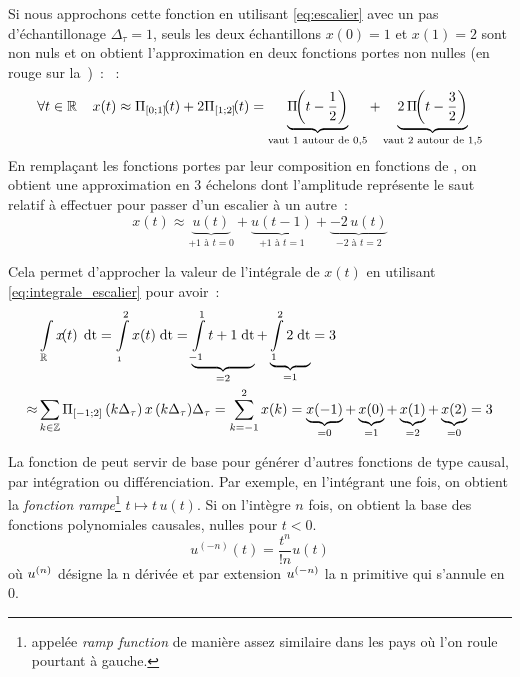 \begin{exemple}
        Si nous approchons cette fonction en utilisant 
        \eqref{eq:escalier} avec un pas d'échantillonage
        $\Delta_\tau=1$, seuls les deux échantillons $x(0)=1$ et
        $x(1)=2$ sont non nuls et on obtient l'approximation en deux
        fonctions portes non nulles (en rouge sur
        la~)~: ~:
        \begin{equation*}
          \forall t\in\R\quads x(t)\approx \porteDe{0}{1}\de{t}+2\porteDe{1}{2}\de{t} = \underbrace{\porte\de{t-\frac{1}{2}}}_{\text{vaut 1 autour de }0,5}+\underbrace{2\,\porte\de{t-\frac{3}{2}}}_{\text{vaut 2 autour de }1,5}
        \end{equation*}
        En remplaçant les fonctions portes par leur composition en
        fonctions de \Heaviside{}, on obtient une approximation en 3
        échelons dont l'amplitude représente le saut relatif à
        effectuer pour passer d'un escalier à un autre~:
        \begin{equation*}
          x(t) \approx \underbrace{u(t)}_{+1\text{ à }t=0} + \underbrace{u(t-1)}_{+1\text{ à }t=1} +\underbrace{ -2\,u(t)}_{-2\text{ à }t=2}
        \end{equation*}

        Cela permet d'approcher la valeur de l'intégrale de $x(t)$
        en utilisant \eqref{eq:integrale_escalier} pour avoir~:
        \begin{eqnarray*}
          &\int\limits_{\mathbb{R}}^{}{x\!\!\left(t\right)\;\mathrm{d{t}}}=\int\limits_{_1}^{2}{x(t)\;\mathrm{d{t}}}=\underbrace{\int\limits_{-1}^{1}{t+1\;\mathrm{d{t}}}}_{=2}+\underbrace{\int\limits_{1}^{2}{2\;\mathrm{d{t}}}}_{=1} = 3 \\
          \approx  &\sum\limits_{k\in\mathbb{Z}}^{}{\Pi_{\left[-1 ; 2\right]}\left(k\Delta_\tau\right)x\left(k\Delta_\tau\right)}\Delta_\tau =  \sum\limits_{k=-1}^{2}{x(k)} = \underbrace{x(-1)}_{=0} + \underbrace{x(0)}_{=1} + \underbrace{x(1)}_{=2} + \underbrace{x(2)}_{=0} = 3
        \end{eqnarray*} 
      \end{exemple}
      
      La fonction de \Heaviside{} peut servir de base pour générer
      d'autres fonctions de type causal, par intégration ou
      différenciation. Par exemple, en l'intégrant une fois, on
      obtient la \emph{fonction rampe}\footnote{appelée \emph{ramp
          function} de manière assez similaire dans les pays où l'on
        roule pourtant à gauche.} $t\mapsto t\,u(t)$. Si on l'intègre
      $n$ fois, on obtient la base des fonctions polynomiales
      causales, \cad{} nulles pour $t<0$.
	\begin{equation}\label{eq:integration_Heaviside}
          u^{(-n)}(t) = \frac{t^{n}}{!n}  u(t)	 	
	\end{equation}	où $u^{\left(n\right)}$ désigne la n\ieme{} dérivée et par extension $u^{\left(-n\right)}$ la n\ieme{} primitive qui s'annule en $0$.
        
